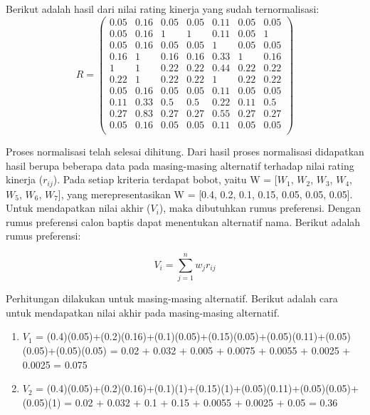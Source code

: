 \documentclass[a4paper,twoside]{article}
\begin{document}
\begin{enumerate}
Berikut adalah hasil dari nilai rating kinerja yang sudah ternormalisasi:
\begin{displaymath} R = 
\left (
\begin{array}{rrrrrrr}
0.05 & 0.16 & 0.05 & 0.05 & 0.11 & 0.05 & 0.05\\		
0.05 & 0.16 & 1 & 1 & 0.11 & 0.05 & 1\\
0.05 & 0.16 & 0.05 & 0.05 & 1 & 0.05 &0.05\\
0.16 & 1 & 0.16 & 0.16 & 0.33 & 1 & 0.16\\
1 & 1 & 0.22 & 0.22 & 0.44 & 0.22 & 0.22\\
0.22 & 1 & 0.22 & 0.22 & 1 & 0.22 & 0.22\\
0.05 & 0.16 & 0.05 & 0.05 & 0.11 &0.05 & 0.05\\
0.11 & 0.33 & 0.5 & 0.5 & 0.22 & 0.11 & 0.5\\
0.27 & 0.83 & 0.27 & 0.27 & 0.55 & 0.27 & 0.27\\
0.05 & 0.16 & 0.05 & 0.05 & 0.11 & 0.05 & 0.05\\
			\end{array}\right )	
	\end{displaymath}

Proses normalisasi telah selesai dihitung. Dari hasil proses normalisasi didapatkan hasil berupa beberapa data pada masing-masing alternatif terhadap nilai rating kinerja ($r_{ij}$). Pada setiap kriteria terdapat bobot, yaitu W = [$W_{1}$, $W_{2}$, $W_{3}$, $W_{4}$, $W_{5}$, $W_{6}$, $W_{7}$], yang merepresentasikan W = [0.4, 0.2, 0.1, 0.15, 0.05, 0.05, 0.05]. Untuk mendapatkan nilai akhir ($V_{i}$), maka dibutuhkan rumus preferensi. Dengan rumus preferensi calon baptis dapat menentukan alternatif nama. Berikut adalah rumus preferensi:

\[
 V_{i} =\displaystyle\sum_{j=1}^{n} w_{j} r_{ij}
\]


Perhitungan dilakukan untuk masing-masing alternatif. Berikut adalah cara untuk mendapatkan nilai akhir pada masing-masing alternatif.

\begin{enumerate}
	\item $V_{1}$ = (0.4)(0.05)+(0.2)(0.16)+(0.1)(0.05)+(0.15)(0.05)+(0.05)(0.11)+(0.05)(0.05)+(0.05)(0.05) = 0.02 + 0.032 + 0.005 + 0.0075 + 0.0055 + 0.0025 + 0.0025 = 0.075
	
	\item $V_{2}$ = (0.4)(0.05)+(0.2)(0.16)+(0.1)(1)+(0.15)(1)+(0.05)(0.11)+(0.05)(0.05)+(0.05)(1) = 0.02 + 0.032 + 0.1 + 0.15 + 0.0055 + 0.0025 + 0.05 = 0.36
	

\end{enumerate}
\end{enumerate}
\end{document}
